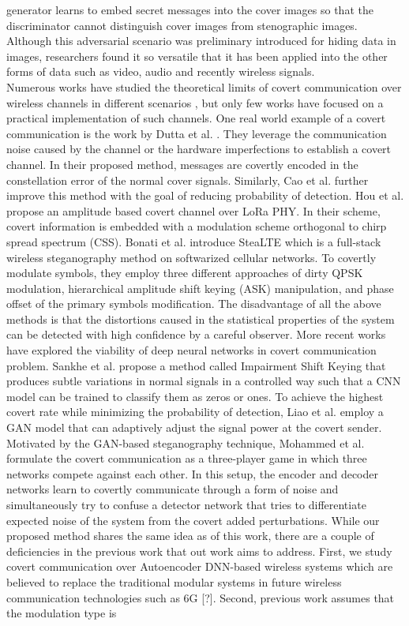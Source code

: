 generator learns to embed secret messages into the cover images so that the discriminator cannot distinguish cover images from stenographic images. Although this adversarial scenario was preliminary introduced for hiding data in images, researchers found it so versatile that it has been applied into the other forms of data such as video, audio and recently wireless signals.\\
Numerous works have studied the theoretical limits of covert communication over wireless channels in different scenarios \cite{bash2012square, soltani2018covert, sheikholeslami2018multi, li2021fundamental}, but only few works have focused on a practical implementation of such channels. One real world example of a covert communication is the work by Dutta et al. \cite{dutta2012secret}. They leverage the communication noise caused by the channel or the hardware imperfections to establish a covert channel. In their proposed method, messages are covertly encoded in the constellation error of the normal cover signals. Similarly, Cao et al. \cite{cao2018wireless} further improve this method with the goal of reducing probability of detection. Hou et al. \cite{hou2020cloaklora} propose an amplitude based covert channel over LoRa PHY. In their scheme, covert information is embedded with a modulation scheme orthogonal to chirp spread spectrum (CSS). Bonati et al. \cite{bonati2021stealte} introduce SteaLTE which is a full-stack wireless steganography method on softwarized cellular networks. To covertly modulate symbols, they employ three different approaches of dirty QPSK modulation, hierarchical amplitude shift keying (ASK) manipulation, and phase offset of the primary symbols modification. The disadvantage of all the above methods is that the distortions caused in the statistical properties of the system can be detected with high confidence by a careful observer. More recent works have explored the viability of deep neural networks in covert communication problem. Sankhe et al. \cite{sankhe2019impairment} propose a method called Impairment Shift Keying that produces subtle variations in normal signals in a controlled way such that a CNN model can be trained to classify them as zeros or ones. To achieve the highest covert rate while minimizing the probability of detection, Liao et al. \cite{liao2020generative} employ a GAN model that can adaptively adjust the signal power at the covert sender. Motivated by the GAN-based steganography technique, Mohammed et al. \cite{mohammed2021adversarial} formulate the covert communication as a three-player game in which three networks compete against each other. In this setup, the encoder and decoder networks learn to covertly communicate through a form of noise and simultaneously try to confuse a detector network that tries to differentiate expected noise of the system from the covert added perturbations. While our proposed method shares the same idea as of this work, there are a couple of deficiencies in the previous work that out work aims to address. First, we study covert communication over Autoencoder DNN-based wireless systems which are believed to replace the traditional modular systems in future wireless communication technologies such as 6G [?]. Second, previous work assumes that the modulation type is 